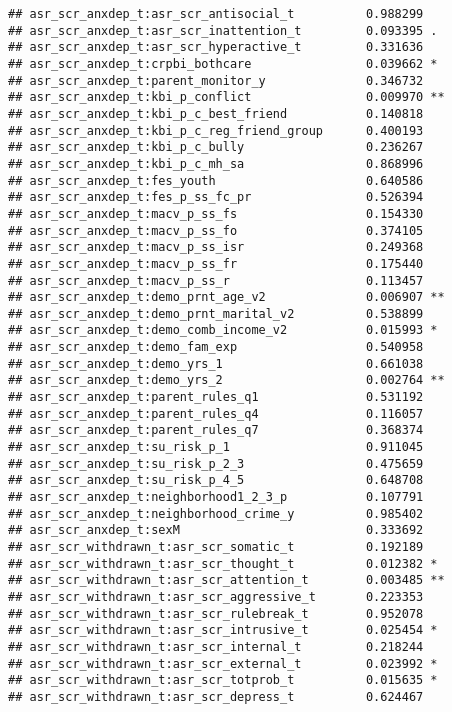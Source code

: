 \documentclass[
]{article}
\begin{document}
\begin{verbatim}
## asr_scr_anxdep_t:asr_scr_antisocial_t          0.988299    
## asr_scr_anxdep_t:asr_scr_inattention_t         0.093395 .  
## asr_scr_anxdep_t:asr_scr_hyperactive_t         0.331636    
## asr_scr_anxdep_t:crpbi_bothcare                0.039662 *  
## asr_scr_anxdep_t:parent_monitor_y              0.346732    
## asr_scr_anxdep_t:kbi_p_conflict                0.009970 ** 
## asr_scr_anxdep_t:kbi_p_c_best_friend           0.140818    
## asr_scr_anxdep_t:kbi_p_c_reg_friend_group      0.400193    
## asr_scr_anxdep_t:kbi_p_c_bully                 0.236267    
## asr_scr_anxdep_t:kbi_p_c_mh_sa                 0.868996    
## asr_scr_anxdep_t:fes_youth                     0.640586    
## asr_scr_anxdep_t:fes_p_ss_fc_pr                0.526394    
## asr_scr_anxdep_t:macv_p_ss_fs                  0.154330    
## asr_scr_anxdep_t:macv_p_ss_fo                  0.374105    
## asr_scr_anxdep_t:macv_p_ss_isr                 0.249368    
## asr_scr_anxdep_t:macv_p_ss_fr                  0.175440    
## asr_scr_anxdep_t:macv_p_ss_r                   0.113457    
## asr_scr_anxdep_t:demo_prnt_age_v2              0.006907 ** 
## asr_scr_anxdep_t:demo_prnt_marital_v2          0.538899    
## asr_scr_anxdep_t:demo_comb_income_v2           0.015993 *  
## asr_scr_anxdep_t:demo_fam_exp                  0.540958    
## asr_scr_anxdep_t:demo_yrs_1                    0.661038    
## asr_scr_anxdep_t:demo_yrs_2                    0.002764 ** 
## asr_scr_anxdep_t:parent_rules_q1               0.531192    
## asr_scr_anxdep_t:parent_rules_q4               0.116057    
## asr_scr_anxdep_t:parent_rules_q7               0.368374    
## asr_scr_anxdep_t:su_risk_p_1                   0.911045    
## asr_scr_anxdep_t:su_risk_p_2_3                 0.475659    
## asr_scr_anxdep_t:su_risk_p_4_5                 0.648708    
## asr_scr_anxdep_t:neighborhood1_2_3_p           0.107791    
## asr_scr_anxdep_t:neighborhood_crime_y          0.985402    
## asr_scr_anxdep_t:sexM                          0.333692    
## asr_scr_withdrawn_t:asr_scr_somatic_t          0.192189    
## asr_scr_withdrawn_t:asr_scr_thought_t          0.012382 *  
## asr_scr_withdrawn_t:asr_scr_attention_t        0.003485 ** 
## asr_scr_withdrawn_t:asr_scr_aggressive_t       0.223353    
## asr_scr_withdrawn_t:asr_scr_rulebreak_t        0.952078    
## asr_scr_withdrawn_t:asr_scr_intrusive_t        0.025454 *  
## asr_scr_withdrawn_t:asr_scr_internal_t         0.218244    
## asr_scr_withdrawn_t:asr_scr_external_t         0.023992 *  
## asr_scr_withdrawn_t:asr_scr_totprob_t          0.015635 *  
## asr_scr_withdrawn_t:asr_scr_depress_t          0.624467    

\end{verbatim}
\end{document}
